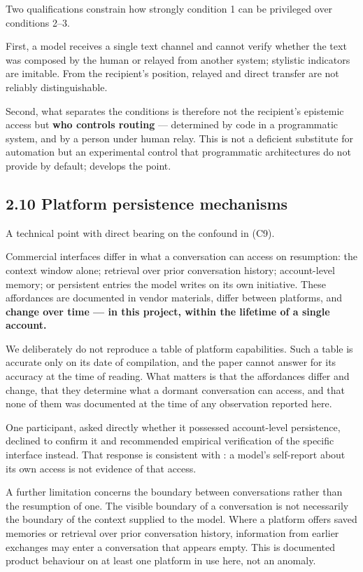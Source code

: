 Two qualifications constrain how strongly condition 1 can be privileged over conditions 2–3.

First, a model receives a single text channel and cannot verify whether the text was composed by the human or relayed from another system; stylistic indicators are imitable. From the recipient's position, relayed and direct transfer are not reliably distinguishable.

Second, what separates the conditions is therefore not the recipient's epistemic access but \textbf{who controls routing} — determined by code in a programmatic system, and by a person under human relay. This is not a deficient substitute for automation but an experimental control that programmatic architectures do not provide by default;  develops the point.


\subsection*{2.10 Platform persistence mechanisms}
\label{sec:en:2.10}

A technical point with direct bearing on the confound in  (C9).

Commercial interfaces differ in what a conversation can access on resumption: the context window alone; retrieval over prior conversation history; account-level memory; or persistent entries the model writes on its own initiative. These affordances are documented in vendor materials, differ between platforms, and \textbf{change over time — in this project, within the lifetime of a single account.}

We deliberately do not reproduce a table of platform capabilities. Such a table is accurate only on its date of compilation, and the paper cannot answer for its accuracy at the time of reading. What matters is that the affordances differ and change, that they determine what a dormant conversation can access, and that none of them was documented at the time of any observation reported here.

One participant, asked directly whether it possessed account-level persistence, declined to confirm it and recommended empirical verification of the specific interface instead. That response is consistent with : a model's self-report about its own access is not evidence of that access.

A further limitation concerns the boundary between conversations rather than the resumption of one. The visible boundary of a conversation is not necessarily the boundary of the context supplied to the model. Where a platform offers saved memories or retrieval over prior conversation history, information from earlier exchanges may enter a conversation that appears empty. This is documented product behaviour on at least one platform in use here, not an anomaly.

